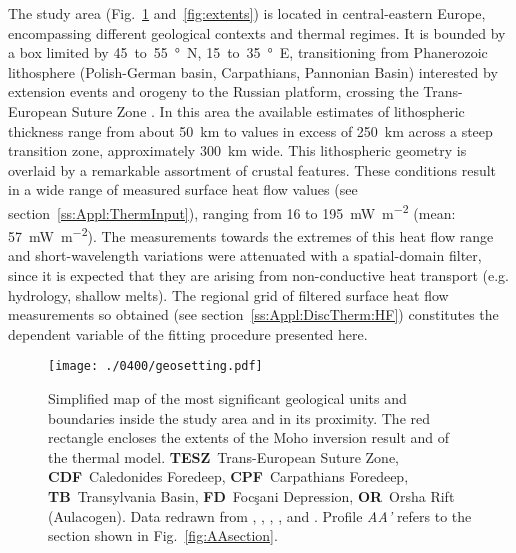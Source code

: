 The study area (Fig.~\ref{fig:geosetting} and~\ref{fig:extents}) is located in central-eastern Europe, encompassing different geological contexts and thermal regimes.
It is bounded by a box limited by \num{45}~to~\SI{55}{\degree N}, \num{15}~to~\SI{35}{\degree E}, transitioning from Phanerozoic lithosphere (Polish-German basin, Carpathians, Pannonian Basin) interested by extension events and orogeny to the Russian platform, crossing the Trans-European Suture Zone \parencite[TESZ,][]{Jones2010}.
In this area the available estimates of lithospheric thickness range from about 50~\si{\kilo \metre} to values in excess of 250~\si{\kilo \metre} across a steep transition zone, approximately 300~\si{\kilo \metre} wide.
This lithospheric geometry is overlaid by a remarkable assortment of crustal features.
These conditions result in a wide range of measured surface heat flow values (see section~\ref{ss:Appl:ThermInput}), ranging from 16 to 195~\si{\milli \watt \per \square \metre} (mean: 57~\si{\milli \watt \per \square \metre}).
The measurements towards the extremes of this heat flow range and short-wavelength variations were attenuated with a spatial-domain filter, since it is expected that they are arising from non-conductive heat transport (e.g. hydrology, shallow melts).
The regional grid of filtered surface heat flow measurements so obtained (see section~\ref{ss:Appl:DiscTherm:HF}) constitutes the dependent variable of the fitting procedure presented here.

\begin{figure}[hb]
    \begin{adjustbox}{center}
        \texttt{[image: ./0400/geosetting.pdf]}
    \end{adjustbox}
	\caption[Simplified map of the most significant geological units and boundaries inside the study area and in its proximity.]{Simplified map of the most significant geological units and boundaries inside the study area and in its proximity. The red rectangle encloses the extents of the Moho inversion result and of the thermal model. \textbf{TESZ}~Trans-European Suture Zone, \textbf{CDF}~Caledonides Foredeep, \textbf{CPF}~Carpathians Foredeep, \textbf{TB}~Transylvania Basin, \textbf{FD}~Focşani Depression, \textbf{OR}~Orsha Rift (Aulacogen). Data redrawn from \textcite{Tarapoanca2003}, \textcite{Tesauro2008}, \textcite{Artemieva2013}, \textcite{Mazur2016}, and \textcite{Starostenko2018}. Profile \textit{AA'} refers to the section shown in Fig.~\ref{fig:AAsection}.}
    \label{fig:geosetting}
\end{figure}

